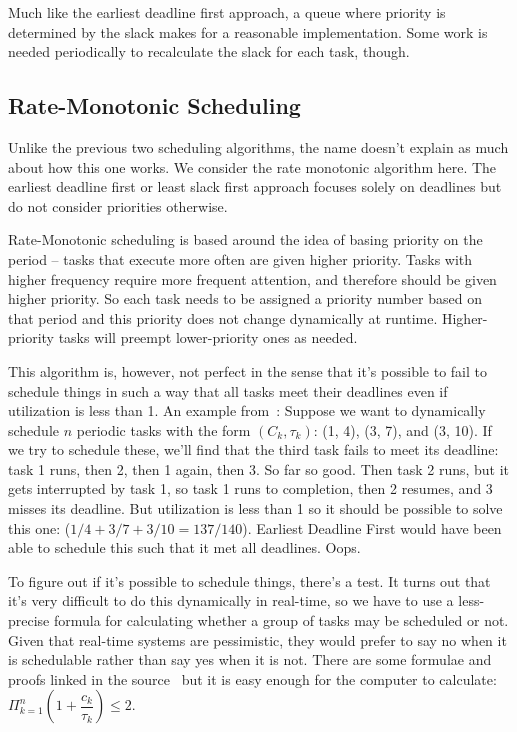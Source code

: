 Much like the earliest deadline first approach, a queue where priority is determined by the slack makes for a reasonable implementation. Some work is needed periodically to recalculate the slack for each task, though. 

\subsection*{Rate-Monotonic Scheduling}

Unlike the previous two scheduling algorithms, the name doesn't explain as much about how this one works. We consider the rate monotonic algorithm here. The earliest deadline first or least slack first approach focuses solely on deadlines but do not consider priorities otherwise. 

Rate-Monotonic scheduling is based around the idea of basing priority on the period -- tasks that execute more often are given higher priority. Tasks with higher frequency require more frequent attention, and therefore should be given higher priority. So each task needs to be assigned a priority number based on that period and this priority does not change dynamically at runtime. Higher-priority tasks will preempt lower-priority ones as needed.

This algorithm is, however, not perfect in the sense that it's possible to fail to schedule things in such a way that all tasks meet their deadlines even if utilization is less than 1. An example from~\cite{mte241}: Suppose we want to dynamically schedule $n$ periodic tasks with the form $(C_{k}, \tau _{k})$: (1, 4), (3, 7), and (3, 10). If we try to schedule these, we'll find that the third task fails to meet its deadline: task 1 runs, then 2, then 1 again, then 3. So far so good. Then task 2 runs, but it gets interrupted by task 1, so task 1 runs to completion, then 2 resumes, and 3 misses its deadline. But utilization is less than 1 so it should be possible to solve this one: ($1/4 + 3/7 + 3/10 = 137/140$). Earliest Deadline First would have been able to schedule this such that it met all deadlines. Oops.

To figure out if it's possible to schedule things, there's a test. It turns out that it's very difficult to do this dynamically in real-time, so we have to use a less-precise formula for calculating whether a group of tasks may be scheduled or not. Given that real-time systems are pessimistic, they would prefer to say no when it is schedulable rather than say yes when it is not. There are some formulae and proofs linked in the source~\cite{mte241} but it is easy enough for the computer to calculate: $\Pi^{n}_{k=1}( 1 + \dfrac{c_k}{\tau _k}) \leq 2$.

